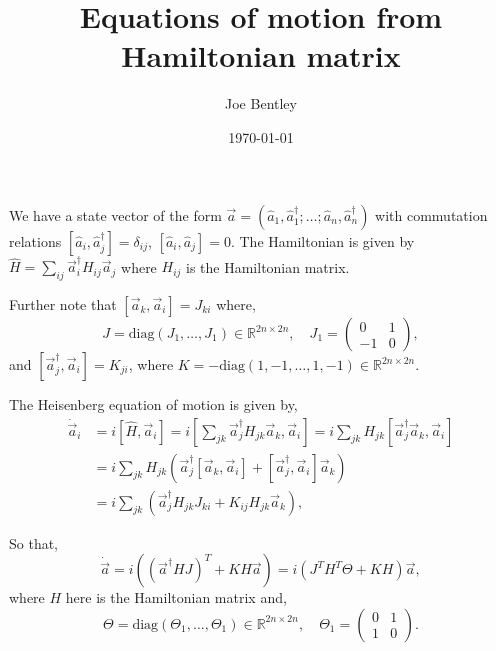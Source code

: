 \documentclass{article}
\title{Equations of motion from Hamiltonian matrix}
\author{Joe Bentley}
\date{\today}
\begin{document}
\maketitle

We have a state vector of the form $\vec{a} = (\hat{a}_1, \hat{a}_1^\dagger;\dots;\hat{a}_n, \hat{a}_n^\dagger)$ with commutation relations $[\hat{a}_i, \hat{a}_j^\dagger] = \delta_{ij}$, $[\hat{a}_i, \hat{a}_j] = 0$. The Hamiltonian is given by $\hat{H} = \sum_{ij} \vec{a}_i^\dagger H_{ij} \vec{a}_j$ where $H_{ij}$ is the Hamiltonian matrix.

Further note that $[\vec{a}_k, \vec{a}_i] = J_{ki}$ where,
\begin{equation}
	J = \text{diag}(J_1, \dots, J_1) \in \mathbb{R}^{2n\times 2n},\quad J_1 = \begin{pmatrix}
		0 & 1 \\ -1 & 0
	\end{pmatrix},
\end{equation}
and $[\vec{a}_j^\dagger, \vec{a}_i] = K_{ji}$, where $K = -\text{diag}(1, -1, \dots, 1, -1)\in \mathbb{R}^{2n\times 2n}$.

The Heisenberg equation of motion is given by,
\begin{align*}
	\dot{\vec{a}}_i &= i[\hat{H},\vec{a}_i] = i[\sum_{jk} \vec{a}_j^\dagger H_{jk} \vec{a}_k, \vec{a}_i] = i \sum_{jk} H_{jk} [\vec{a}_j^\dagger \vec{a}_k, \vec{a}_i] \\
	&= i \sum_{jk} H_{jk} (\vec{a}_j^\dagger [\vec{a}_k, \vec{a}_i] + [\vec{a}_j^\dagger, \vec{a}_i]\vec{a}_k) \\
	&= i \sum_{jk}(\vec{a}_j^\dagger H_{jk} J_{ki} + K_{ij} H_{jk} \vec{a}_k),
\end{align*}

So that,
\begin{equation}
	\dot{\vec{a}} = i((\vec{a}^\dagger H J)^T + K H \vec{a}) = i(J^TH^T\Theta+KH)\vec{a},
\end{equation}
where $H$ here is the Hamiltonian matrix and,
\begin{equation}
	\Theta = \text{diag}(\Theta_1,\dots,\Theta_1) \in \mathbb{R}^{2n\times 2n},\quad \Theta_1 = \begin{pmatrix}0&1\\1&0\end{pmatrix}.
\end{equation}
\end{document}
